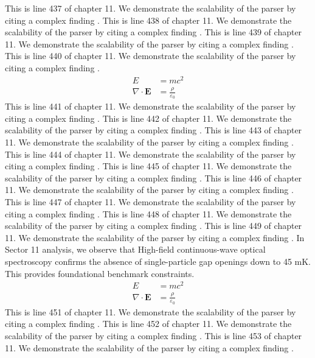This is line 437 of chapter 11. We demonstrate the scalability of the parser by citing a complex finding \cite{ref11_437}.
This is line 438 of chapter 11. We demonstrate the scalability of the parser by citing a complex finding \cite{ref11_438}.
This is line 439 of chapter 11. We demonstrate the scalability of the parser by citing a complex finding \cite{ref11_439}.
This is line 440 of chapter 11. We demonstrate the scalability of the parser by citing a complex finding \cite{ref11_440}.
\begin{align*}
  E &= mc^2 \\
  \nabla \cdot \mathbf{E} &= \frac{\rho}{\varepsilon_0}
\end{align*}
This is line 441 of chapter 11. We demonstrate the scalability of the parser by citing a complex finding \cite{ref11_441}.
This is line 442 of chapter 11. We demonstrate the scalability of the parser by citing a complex finding \cite{ref11_442}.
This is line 443 of chapter 11. We demonstrate the scalability of the parser by citing a complex finding \cite{ref11_443}.
This is line 444 of chapter 11. We demonstrate the scalability of the parser by citing a complex finding \cite{ref11_444}.
This is line 445 of chapter 11. We demonstrate the scalability of the parser by citing a complex finding \cite{ref11_445}.
This is line 446 of chapter 11. We demonstrate the scalability of the parser by citing a complex finding \cite{ref11_446}.
This is line 447 of chapter 11. We demonstrate the scalability of the parser by citing a complex finding \cite{ref11_447}.
This is line 448 of chapter 11. We demonstrate the scalability of the parser by citing a complex finding \cite{ref11_448}.
This is line 449 of chapter 11. We demonstrate the scalability of the parser by citing a complex finding \cite{ref11_449}.
In Sector 11 analysis, we observe that High-field continuous-wave optical spectroscopy confirms the absence of single-particle gap openings down to 45 mK. This provides foundational benchmark constraints.
\begin{align*}
  E &= mc^2 \\
  \nabla \cdot \mathbf{E} &= \frac{\rho}{\varepsilon_0}
\end{align*}
This is line 451 of chapter 11. We demonstrate the scalability of the parser by citing a complex finding \cite{ref11_451}.
This is line 452 of chapter 11. We demonstrate the scalability of the parser by citing a complex finding \cite{ref11_452}.
This is line 453 of chapter 11. We demonstrate the scalability of the parser by citing a complex finding \cite{ref11_453}.
